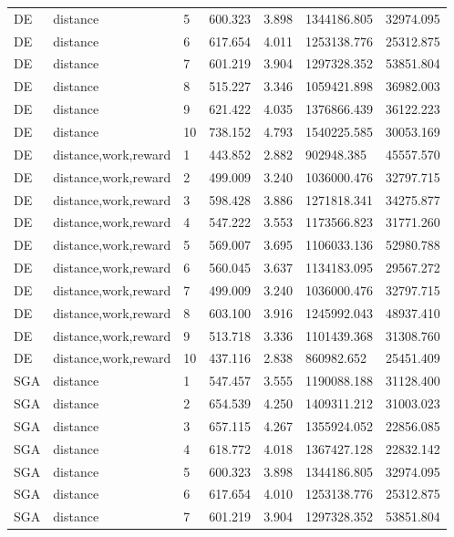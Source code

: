 \documentclass{tamuccthesis}
\begin{document}
\begin{appendices}
\begin{small}
\begin{longtable}{lllllll}
DE  & distance    & 5   & 600.323 & 3.898 & 1344186.805 & 32974.095 \\
DE  & distance    & 6   & 617.654 & 4.011 & 1253138.776 & 25312.875 \\
DE  & distance    & 7   & 601.219 & 3.904 & 1297328.352 & 53851.804 \\
DE  & distance    & 8   & 515.227 & 3.346 & 1059421.898 & 36982.003 \\
DE  & distance    & 9   & 621.422 & 4.035 & 1376866.439 & 36122.223 \\
DE  & distance    & 10  & 738.152 & 4.793 & 1540225.585 & 30053.169 \\
DE  & distance,work,reward  & 1  & 443.852 & 2.882 & 902948.385  & 45557.570 \\
DE  & distance,work,reward  & 2  & 499.009 & 3.240 & 1036000.476 & 32797.715 \\
DE  & distance,work,reward  & 3  & 598.428 & 3.886 & 1271818.341 & 34275.877 \\
DE  & distance,work,reward  & 4  & 547.222 & 3.553 & 1173566.823 & 31771.260 \\
DE  & distance,work,reward  & 5  & 569.007 & 3.695 & 1106033.136 & 52980.788 \\
DE  & distance,work,reward  & 6  & 560.045 & 3.637 & 1134183.095 & 29567.272 \\
DE  & distance,work,reward  & 7  & 499.009 & 3.240 & 1036000.476 & 32797.715 \\
DE  & distance,work,reward  & 8  & 603.100 & 3.916 & 1245992.043 & 48937.410 \\
DE  & distance,work,reward  & 9  & 513.718 & 3.336 & 1101439.368 & 31308.760 \\
DE  & distance,work,reward  & 10 & 437.116 & 2.838 &  860982.652 & 25451.409 \\
SGA & distance    & 1   & 547.457 & 3.555 & 1190088.188 & 31128.400 \\
SGA & distance    & 2   & 654.539 & 4.250 & 1409311.212 & 31003.023  \\
SGA & distance    & 3   & 657.115 & 4.267 & 1355924.052 & 22856.085 \\
SGA & distance    & 4   & 618.772 & 4.018 & 1367427.128 & 22832.142 \\
SGA & distance    & 5   & 600.323 & 3.898 & 1344186.805 & 32974.095 \\
SGA & distance    & 6   & 617.654 & 4.010 & 1253138.776 & 25312.875 \\
SGA & distance    & 7   & 601.219 & 3.904 & 1297328.352 & 53851.804 \\

\end{longtable}
\end{small}
\end{appendices}
\end{document}
